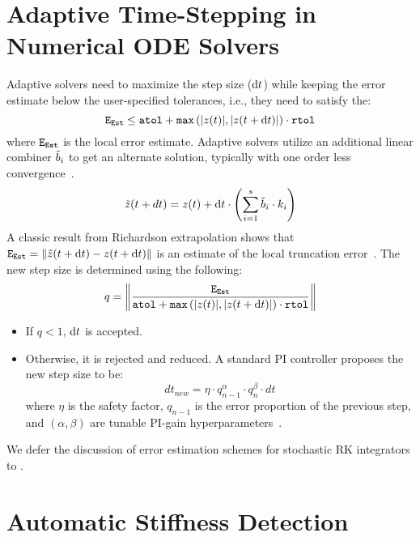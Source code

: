 \section{Adaptive Time-Stepping in Numerical ODE Solvers}
\label{sec:adaptive_time_stepping}

Adaptive solvers need to maximize the step size ($\mathrm{d}t$) while keeping the error estimate below the user-specified tolerances, i.e., they need to satisfy the:
%
\begin{equation}
  \texttt{E}_{\texttt{Est}} \leq \texttt{atol} + \texttt{max}\left( |z(t)|, |z(t + \mathrm{d}t)|\right) \cdot \texttt{rtol}
\end{equation}
%
where $\texttt{E}_{\texttt{Est}}$ is the local error estimate. Adaptive solvers utilize an additional linear combiner $\Tilde{b}_i$ to get an alternate solution, typically with one order less convergence~\citep{wanner1996solving, fehlberg1968classical, dormand1980family,tsitouras2011runge}.
%
\begin{equation}
  \Tilde{z}(t + dt) = z(t) + \mathrm{d}t \cdot \left( \sum_{i = 1}^s \Tilde{b}_i \cdot k_i \right)
\end{equation}
%
A classic result from Richardson extrapolation shows that $\texttt{E}_{\texttt{Est}} = \| \Tilde{z}(t + \mathrm{d}t) - z(t + \mathrm{d}t) \|$ is an estimate of the local truncation error~\citep{hairer1, ascher1998computer}. The new step size is determined using the following:
%
\begin{equation}
  q = \left\| \frac{\texttt{E}_{\texttt{Est}}}{\texttt{atol} + \texttt{max}\left( |z(t)|, |z(t + \mathrm{d}t)|\right) \cdot \texttt{rtol}} \right\|
\end{equation}
%
\begin{itemize}
  \item If $q < 1$, $\mathrm{d}t$ is accepted.
  \item Otherwise, it is rejected and reduced. A standard PI controller proposes the new step size to be:
        \begin{equation}
          dt_{new} = \eta \cdot q_{n - 1}^\alpha \cdot q_{n}^\beta \cdot dt
        \end{equation}
        where $\eta$ is the safety factor, $q_{n - 1}$ is the error proportion of the previous step, and $(\alpha, \beta)$ are tunable PI-gain hyperparameters~\cite{wanner1996solving}.
\end{itemize}

We defer the discussion of error estimation schemes for stochastic RK integrators to  \citet{rackauckas2017adaptive, rackauckas2020sosri}.

\section{Automatic Stiffness Detection}
\label{sec:automatic_stiffness_detection}

